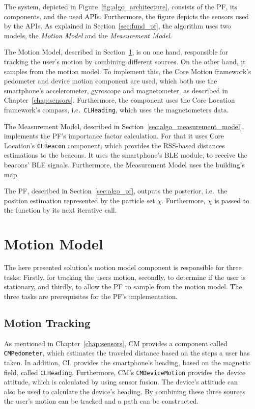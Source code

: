 The system, depicted in Figure~\ref{fig:algo_architecture}, consists of the \ac{PF}, its components, and the used \acsp{API}. Furthermore, the figure depicts the sensors used by the \acsp{API}. As explained in Section~\ref{sec:fund_pf}, the algorithm uses two models, the \emph{Motion Model} and the \emph{Measurement Model}.

The Motion Model, described in Section~\ref{sec:algo_motion_model}, is on one hand, responsible for tracking the user's motion by combining different sources. On the other hand, it samples from the motion model. To implement this, the Core Motion framework's pedometer and device motion component are used, which both use the smartphone's accelerometer, gyroscope and magnetometer, as described in Chapter~\ref{chap:sensors}. Furthermore, the component uses the Core Location framework's compass, i.e.\ \texttt{CLHeading}, which uses the magnetometers data.

The Measurement Model, described in Section~\ref{sec:algo_measurement_model}, implements the \acs{PF}'s importance factor calculation. For that it uses Core Location's \texttt{CLBeacon} component, which provides the \acs{RSS}-based distances estimations to the beacons. It uses the smartphone's \acf{BLE} module, to receive the beacons' \ac{BLE} signals. Furthermore, the Measurement Model uses the building's map.

The \acl{PF}, described in Section~\ref{sec:algo_pf}, outputs the posterior, i.e.\ the position estimation represented by the particle set $\chi$. Furthermore, $\chi$ is passed to the function by its next iterative call.


\section{Motion Model}\label{sec:algo_motion_model}
The here presented solution's motion model component is responsible for three tasks: Firstly, for tracking the users motion, secondly, to determine if the user is stationary, and thirdly, to allow the \acs{PF} to sample from the motion model. The three tasks are prerequisites for the \acs{PF}'s implementation.

\subsection{Motion Tracking}
As mentioned in Chapter~\ref{chap:sensors}, \acl{CM} provides a component called \texttt{CMPedometer}, which estimates the traveled distance based on the steps a user has taken. In addition, \acl{CL} provides the smartphone's heading, based on the magnetic field, called \texttt{CLHeading}. Furthermore, \ac{CM}'s \texttt{CMDeviceMotion} provides the device attitude, which is calculated by using sensor fusion. The device's attitude can also be used to calculate the device's heading. By combining these three sources the user's motion can be tracked and a path can be constructed.

